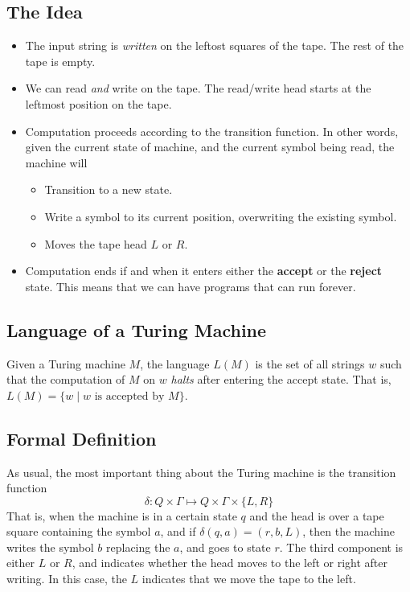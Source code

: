 \documentclass[letterpaper]{article}
\begin{document}
\subsection{The Idea}
\begin{itemize}
    \item The input string is \emph{written} on the leftost squares of the tape. The rest of the tape is empty. 
    \item We can read \emph{and} write on the tape. The read/write head starts at the leftmost position on the tape. 
    \item Computation proceeds according to the transition function. In other words, given the current state of machine, and the current symbol being read, the machine will 
    \begin{itemize}
        \item Transition to a new state.
        \item Write a symbol to its current position, overwriting the existing symbol.
        \item Moves the tape head $L$ or $R$. 
    \end{itemize}
    \item Computation ends if and when it enters either the \textbf{accept} or the \textbf{reject} state. This means that we can have programs that can run forever. 
\end{itemize}

\subsection{Language of a Turing Machine}
Given a Turing machine $M$, the language $L(M)$ is the set of all strings $w$ such that the computation of $M$ on $w$ \emph{halts} after entering the accept state. That is, $L(M) = \{w \mid w \text{ is accepted by } M\}$.

\subsection{Formal Definition}
As usual, the most important thing about the Turing machine is the transition function 
\[\delta: Q \times \Gamma \mapsto Q \times \Gamma \times \{L, R\}\]
That is, when the machine is in a certain state $q$ and the head is over a tape square containing the symbol $a$, and if $\delta(q, a) = (r, b, L)$, then the machine writes the symbol $b$ replacing the $a$, and goes to state $r$. The third component is either $L$ or $R$, and indicates whether the head moves to the left or right after writing. In this case, the $L$ indicates that we move the tape to the left. 
\end{document}
